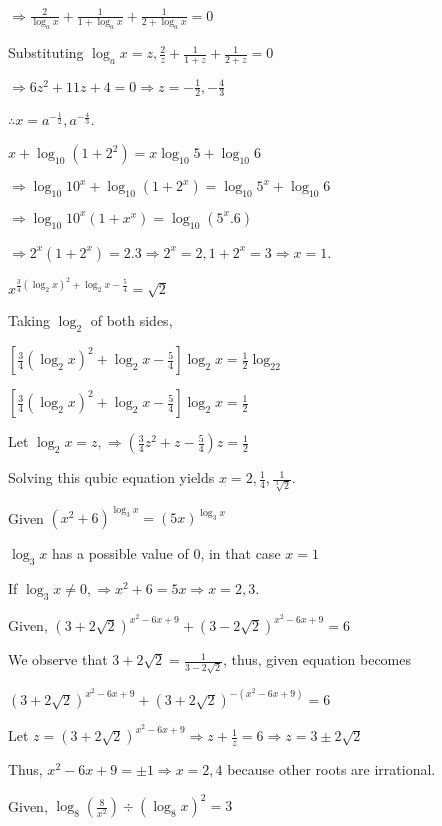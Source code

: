   $\Rightarrow \frac{2}{\log_ax} + \frac{1}{1 + \log_ax} + \frac{1}{2 + \log_ax} = 0$

  Substituting $\log_ax = z, \frac{2}{z} + \frac{1}{1 + z} + \frac{1}{2 + z} = 0$

  $\Rightarrow 6z^2 + 11z + 4 = 0 \Rightarrow z = -\frac{1}{2}, -\frac{4}{3}$

  $\therefore x = a^{-\tfrac{1}{2}}, a^{-\tfrac{4}{3}}$.
\item $x + \log_{10}(1 + 2^2) = x\log_{10}5 + \log_{10}6$

  $\Rightarrow \log_{10}10^x + \log_{10}(1 + 2^x) = \log_{10}5^x + \log_{10}6$

  $\Rightarrow \log_{10}10^x(1 + x^x) = \log_{10}(5^x.6)$

  $\Rightarrow 2^x(1 + 2^x) = 2.3 \Rightarrow 2^x = 2, 1 + 2^x = 3 \Rightarrow x = 1$.
\item $x^{\tfrac{3}{4}(\log_2x)^2 + \log_2x - \tfrac{5}{4}} = \sqrt{2}$

  Taking $\log_2$ of both sides,

  $\left[\frac{3}{4}(\log_2x)^2 + \log_2x - \frac{5}{4}\right]\log_2x = \frac{1}{2}\log_22$

  $\left[\frac{3}{4}(\log_2x)^2 + \log_2x - \frac{5}{4}\right]\log_2x = \frac{1}{2}$

  Let $\log_2x = z, \Rightarrow \left(\frac{3}{4}z^2 + z - \frac{5}{4}\right)z = \frac{1}{2}$

  Solving this qubic equation yields $x = 2, \frac{1}{4}, \frac{1}{\sqrt[3]{2}}$.
\item Given $(x^2 + 6)^{\log_3x} = (5x)^{\log_3x}$

  $\log_3x$ has a possible value of $0$, in that case $x = 1$

  If $\log_3x\neq 0, \Rightarrow x^2 + 6 = 5x \Rightarrow x = 2, 3$.
\item Given, $(3 + 2\sqrt{2})^{x^2 - 6x + 9} + (3 - 2\sqrt{2})^{x^2 - 6x + 9} = 6$

  We observe that $3 + 2\sqrt{2} = \frac{1}{3 - 2\sqrt{2}}$, thus, given equation becomes

  $(3 + 2\sqrt{2})^{x^2 - 6x + 9} + (3 + 2\sqrt{2})^{-(x^2 - 6x + 9)} = 6$

  Let $z = (3 + 2\sqrt{2})^{x^2 - 6x + 9}\Rightarrow z + \frac{1}{z} = 6 \Rightarrow z = 3\pm2\sqrt{2}$

  Thus, $x^2 - 6x + 9 = \pm 1 \Rightarrow x = 2, 4$ because other roots are irrational.
\item Given, $\log_8\left(\frac{8}{x^2}\right)\div(\log_8x)^2 = 3$

